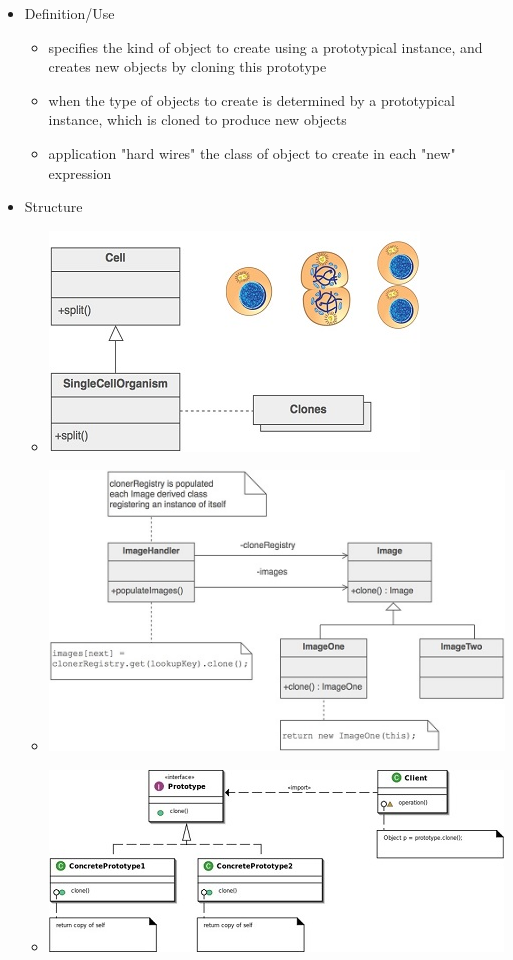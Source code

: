\documentclass[11pt]{article}
\begin{document}
\begin{itemize}
   \item Definition/Use

   \begin{itemize}
     \item specifies the kind of object to create using a prototypical instance, and creates new objects by cloning this prototype
     \item when the type of objects to create is determined by a prototypical instance, which is cloned to produce new objects
     \item application "hard wires" the class of object to create in each "new" expression
   \end{itemize}

   \item Structure

   \begin{itemize}
     \item \includegraphics{prototype_example}
     \item \includegraphics{prototype_structure}
     \item \includegraphics{prototype_uml_structure}
   \end{itemize}


\end{itemize}
\end{document}
